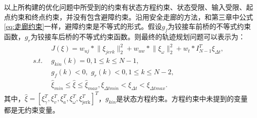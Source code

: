 \documentclass[master,academic]{ysuthesis} %
\begin{document}
		以上所构建的优化问题中所受到的约束有状态方程约束、状态受限、输入受限、起点约束和终点约束，并没有包含避障约束。沿用安全走廊的方法，和第三章中公式\ref{eq:走廊约束}一样，避障约束是不等式的形式。假设$g_f$为铰接车前桥的不等式约束函数，$g_r$为铰接车后桥的不等式约束函数。则最终的轨迹规划问题可以表示为：
		\begin{equation}
			\begin{aligned}
			&J\left( \xi \right) =w_{uj}*\lVert \xi _{jerk} \rVert _{2}^{2}+w_{uw}*\lVert \xi _{\omega} \rVert _{2}^{2}+w_t*I_{N-1}^{T}\xi _{\Delta t},\\
			s.t.\ \ &g_{kin}\left( k \right) =0,1\leq k\leq N-1,\\
			&g_f\left( k \right) <0,\,\,g_r\left( k \right) <0,1\leq k\leq N-2,\\
			&\hat{\xi}_{min}\le \hat{\xi}\le \hat{\xi}_{max},\xi _{\Delta tmin}<\xi _{\Delta t}<\xi _{\Delta tmax}.
			\end{aligned}   
		\end{equation}
		其中，$\hat{\xi}=\left[ \xi _{\gamma}^{T},\xi _{v}^{T},\xi _{a}^{T},\xi _{\omega}^{T},\xi _{\text{jerk}}^{T} \right] ^T$，$g_{kin}$是状态方程约束。方程约束中未提到的变量都是无约束变量。
\end{document}
